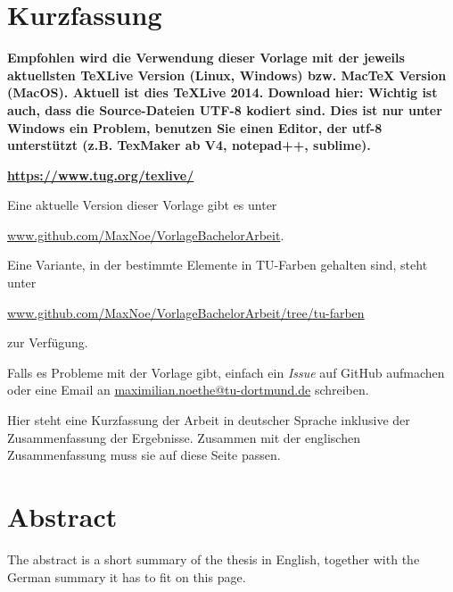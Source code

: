 \thispagestyle{plain}
\section*{Kurzfassung}

\textbf{\large Empfohlen wird die Verwendung dieser Vorlage mit der jeweils aktuellsten TeXLive Version (Linux, Windows) bzw. MacTeX Version (MacOS).
Aktuell ist dies TeXLive 2014. Download hier: 
Wichtig ist auch, dass die Source-Dateien UTF-8 kodiert sind. Dies
ist nur unter Windows ein Problem, benutzen Sie einen Editor, der
utf-8 unterstützt (z.B. TexMaker ab V4, notepad++, sublime).
}

\href{https://www.tug.org/texlive/}{\textbf{\large https://www.tug.org/texlive/}}

Eine aktuelle Version dieser Vorlage gibt es unter 

\href{https://github.com/MaxNoe/VorlageBachelorArbeit}{www.github.com/MaxNoe/VorlageBachelorArbeit}.

Eine Variante, in der bestimmte Elemente in TU-Farben gehalten sind, steht unter 

\href{https://github.com/MaxNoe/VorlageBachelorArbeit/tree/tu-farben}{www.github.com/MaxNoe/VorlageBachelorArbeit/tree/tu-farben}  

zur Verfügung.

Falls es Probleme mit der Vorlage gibt, einfach ein \emph{Issue} auf GitHub aufmachen oder eine Email an
\href{mailto:maximilian.noethe@tu-dortmund.de}{maximilian.noethe@tu-dortmund.de} schreiben.


Hier steht eine Kurzfassung der Arbeit in deutscher Sprache inklusive der Zusammenfassung der
Ergebnisse.
Zusammen mit der englischen Zusammenfassung muss sie auf diese Seite passen.

\section*{Abstract}

The abstract is a short summary of the thesis in English, together with the German summary it has to fit on this page.
